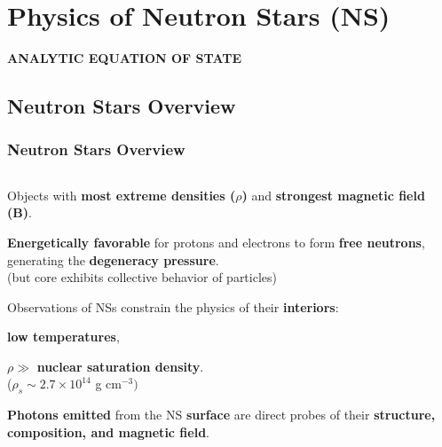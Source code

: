 \section{Physics of  Neutron Stars (NS)}


\begin{frame}
\begin{center}
 
	{\bf  ANALYTIC EQUATION OF STATE}
\end{center}

\end{frame}

\subsection*{Neutron Stars Overview}
\begin{frame}
\frametitle{Neutron Stars Overview}  
\begin{columns}[c]
\begin{column}{0.65\textwidth} 
\begin{enumerate}
\scriptsize{
 \item Objects with {\bf most extreme densities ($\rho$)}  and {\bf strongest magnetic field (B)}.
 
 \quad
 
 \item  {\bf Energetically favorable} for protons and electrons to form {\bf free neutrons}, generating the {\bf degeneracy pressure}.\\ {\tiny (but core exhibits collective behavior of particles)}
 
 \quad
  
 
\item Observations of NSs constrain the physics of their {\bf interiors}:
\begin{itemize}\scriptsize{
 \item {\bf low temperatures},
 \item $\rho \gg$ {\bf  nuclear saturation density}. \\{\tiny ($\rho_s \sim 2.7 \times 10^{14}$ g cm$^{-3})$}}
\end{itemize}

  \quad
  
 
 \item {\bf Photons emitted} from the NS {\bf surface} are direct probes of their {\bf structure, composition, and magnetic field}.
 
}
\end{enumerate}
\end{column}
\end{columns}
\end{frame}
